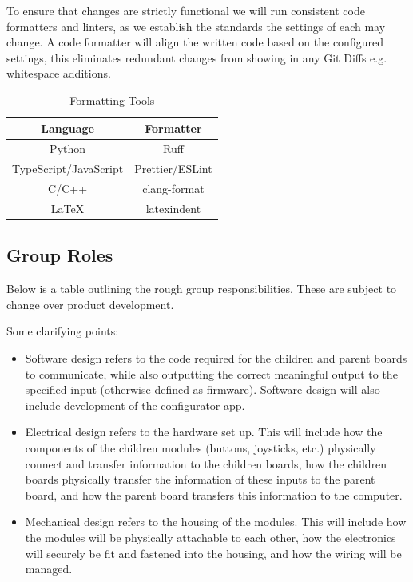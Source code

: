 \documentclass[a4]{article}
\begin{document}
To ensure that changes are strictly functional we will run consistent code formatters and linters,
as we establish the standards the settings of each may change. A code formatter will align the written code
based on the configured settings, this eliminates redundant changes from showing in any Git Diffs e.g. whitespace additions.

\begin{table}[h!]
	\centering
	\begin{tabular}{|c|c|}
		\hline
		\textcolor{McMasterMaroon}{\textbf{Language}} &
		\textcolor{McMasterMaroon}{\textbf{Formatter}}                  \\
		\hline
		Python                                        & Ruff            \\
		\hline
		TypeScript/JavaScript                         & Prettier/ESLint \\
		\hline
		C/C++                                         & clang-format    \\
		\hline
		LaTeX                                         & latexindent     \\
		\hline
	\end{tabular}
	\caption{Formatting Tools}
\end{table}






\clearpage
\subsection{Group Roles}

Below is a table outlining the rough group responsibilities. These are subject to change over product development.

Some clarifying points:
\begin{itemize}
	\item \textcolor{McMasterMaroon}{Software design} refers to the code required for the children and parent boards to communicate, while also outputting the correct meaningful output to the specified input (otherwise defined as firmware). Software design will also include development of the configurator app.
	\item \textcolor{McMasterMaroon}{Electrical design} refers to the hardware set up. This will include how the components of the children modules (buttons, joysticks, etc.) physically connect and transfer information to the children boards, how the children boards physically transfer the information of these inputs to the parent board, and how the parent board transfers this information to the computer.
	\item \textcolor{McMasterMaroon}{Mechanical design} refers to the housing of the modules. This will include how the modules will be physically attachable to each other, how the electronics will securely be fit and fastened into the housing, and how the wiring will be managed.   
\end{itemize}
\end{document}
